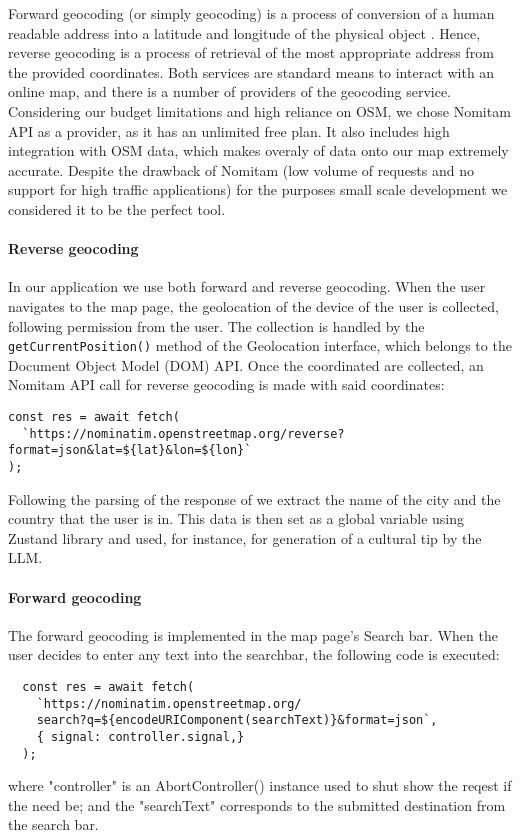 Forward geocoding (or simply geocoding) is a process of conversion of a human readable address into a latitude and longitude of the physical object \cite{forwardAndReverseGeocoding}. Hence, reverse geocoding is a process of retrieval of the most appropriate address from the provided coordinates. Both services are standard means to interact with an online map, and there is a number of providers of the geocoding service. Considering our budget limitations and high reliance on OSM, we chose Nomitam API as a provider, as it has an unlimited free plan. It also includes high integration with OSM data, which makes overaly of data onto our map extremely accurate. Despite the drawback of Nomitam (low volume of requests and no support for high traffic applications) for the purposes small scale development we considered it to be the perfect tool. 

\paragraph{Reverse geocoding}
In our application we use both forward and reverse geocoding. When the user navigates to the map page, the geolocation of the device of the user is collected, following permission from the user. The collection is handled by the \texttt{getCurrentPosition()} method of the Geolocation interface, which belongs to the Document Object Model (DOM) API. Once the coordinated are collected, an Nomitam API call for reverse geocoding is made with said coordinates:
\begin{verbatim}
const res = await fetch(
  `https://nominatim.openstreetmap.org/reverse?format=json&lat=${lat}&lon=${lon}`
);
\end{verbatim}
Following the parsing of the response of we extract the name of the city and the country that the user is in. This data is then set as a global variable using Zustand library and used, for instance, for generation of a cultural tip by the LLM.

\paragraph{Forward geocoding}
The forward geocoding is implemented in the map page's Search bar. When the user decides to enter any text into the searchbar, the following code is executed:
\begin{verbatim}
  const res = await fetch(
    `https://nominatim.openstreetmap.org/
    search?q=${encodeURIComponent(searchText)}&format=json`,
    { signal: controller.signal,}
  );
\end{verbatim}
where "controller" is an AbortController() instance used to shut show the reqest if the need be; and the "searchText" corresponds to the submitted destination from the search bar. 

